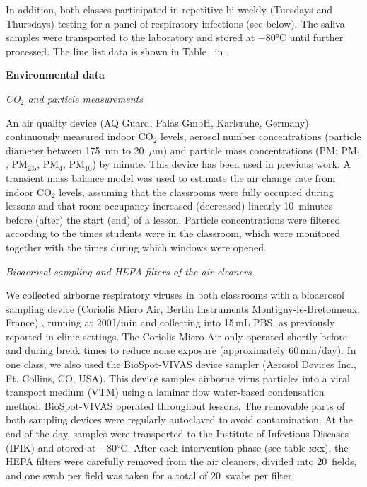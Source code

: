 \documentclass[fleqn,11pt]{wlscirep}
\begin{document}
In addition, both classes participated in repetitive bi-weekly (Tuesdays and Thursdays) testing for a panel of respiratory infections (see  below). The saliva samples were transported to the laboratory and stored at $-$80°C until further processed\cite{Galar2021,To2019,Huber2021}. The line list data is shown in Table~ in \supp. \medskip

\noindent\textbf{Environmental data} \smallskip

\noindent \emph{CO$_2$ and particle measurements} 

\noindent An air quality device (AQ Guard, Palas GmbH, Karlsruhe, Germany) continuously measured indoor CO$_2$ levels, aerosol number concentrations (particle diameter between 175~nm to 20~$\mu$m) and particle mass concentrations (PM; PM$_1$, PM$_{2.5}$, PM$_4$, PM$_{10}$) by minute. This device has been used in previous work\cite{DiGilio2021,Duill2021,Banholzer2023PLoSMed}. A transient mass balance model was used to estimate the air change rate from indoor CO$_2$ levels\cite{Batterman2017IJERPH}, assuming that the classrooms were fully occupied during lessons and that room occupancy increased (decreased) linearly 10~minutes before (after) the start (end) of a lesson. Particle concentrations were filtered according to the times students were in the classroom, which were monitored together with the times during which windows were opened. \medskip

\noindent \emph{Bioaerosol sampling and HEPA filters of the air cleaners} 

\noindent We collected airborne respiratory viruses in both classrooms with a bioaerosol sampling device (Coriolis Micro Air, Bertin Instruments Montigny-le-Bretonneux, France) , running at 200\,l/min and collecting into 15\,mL PBS, as previously reported in clinic settings\cite{Moore2021}. The Coriolis Micro Air only operated shortly before and during break times to reduce noise exposure (approximately 60\,min/day). In one class, we also used the BioSpot-VIVAS device sampler (Aerosol Devices Inc., Ft. Collins, CO, USA). This device samples airborne virus particles into a viral transport medium (VTM) using a laminar flow water-based condensation method\cite{Pan2016JAM,Lednicky2016AST}. BioSpot-VIVAS operated throughout lessons. The removable parts of both sampling devices were regularly autoclaved to avoid contamination. At the end of the day, samples were transported to the Institute of Infectious Diseases (IFIK) and stored at $-$80°C. After each intervention phase (see table xxx), the HEPA filters were carefully removed from the air cleaners, divided into 20~fields, and one swab per field was taken for a total of 20~swabs per filter.\medskip
\end{document}
